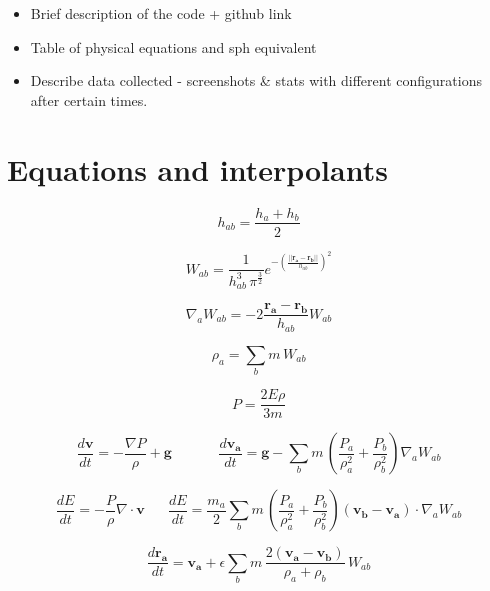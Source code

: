 \documentclass[../main.tex]{subfiles}
\begin{document}
\begin{itemize}
    \item Brief description of the code + github link
    \item Table of physical equations and sph equivalent
    \item Describe data collected - screenshots \& stats with different configurations after certain
        times.
\end{itemize}

\section{Equations and interpolants}

\begin{equation}
    h_{ab} = \frac{h_a + h_b}{2}
\end{equation}

\begin{equation}
    W_{ab} = \frac{1}{h_{ab}^3 \, \pi^{\frac{3}{2}}} e^{-(\frac{||\bm{r_a} - \bm{r_b}||}{h_{ab}})^2}
\end{equation}

\begin{equation}
    \nabla_a W_{ab} = -2 \frac{\bm{r_a} - \bm{r_b}}{h_{ab}} W_{ab}
\end{equation}

\begin{equation}
    \rho_a = \sum_b m \, W_{ab}
\end{equation}

\begin{equation}
    P = \frac{2 E \rho}{3 m}
\end{equation}

\begin{equation}
    \frac{d\bm{v}}{dt}
    = -\frac{\nabla P}{\rho} + \bm{g}
    \hspace{20pt}
    \hspace{20pt}
    \frac{d\bm{v_a}}{dt}
    = \bm{g} - \sum_b m \, (\frac{P_a}{\rho_a^2} + \frac{P_b}{\rho_b^2}) \nabla_a W_{ab}
\end{equation}

\begin{equation}
    \frac{dE}{dt}
    = - \frac{P}{\rho} \nabla \cdot \bm{v}
    \hspace{20pt}
    \frac{dE}{dt}
    = \frac{m_a}{2} \sum_b m \, (\frac{P_a}{\rho_a^2} + \frac{P_b}{\rho_b^2}) (\bm{v_b} - \bm{v_a})
    \cdot \nabla_a W_{ab}
\end{equation}

\begin{equation}
    \frac{d\bm{r_a}}{dt}
    = \bm{v_a} + \epsilon \sum_b m \, \frac{2 (\bm{v_a} - \bm{v_b})}{\rho_a + \rho_b} \, W_{ab}
\end{equation}
\end{document}
